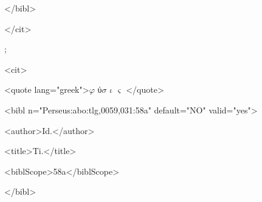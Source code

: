 \documentclass[10pt]{article}
\begin{document}
\begin{adjustwidth}{0.99in}{0.0in}
 </bibl>\par

\end{adjustwidth}

\begin{adjustwidth}{0.85in}{0.0in}
 </cit>\par

\end{adjustwidth}

\begin{adjustwidth}{0.85in}{0.0in}
 ;\par

\end{adjustwidth}

\begin{adjustwidth}{0.85in}{0.0in}
 <cit>\par

\end{adjustwidth}

\begin{adjustwidth}{0.99in}{0.0in}
 <quote lang="greek">$ \varphi $ ύ$ \sigma $ $ \iota $ $ \varsigma $ </quote>\par

\end{adjustwidth}

\begin{adjustwidth}{0.99in}{0.0in}
 <bibl n="Perseus:abo:tlg,0059,031:58a" default="NO" valid="yes">\par

\end{adjustwidth}

\begin{adjustwidth}{1.12in}{0.0in}
 <author>Id.</author>\par

\end{adjustwidth}

\begin{adjustwidth}{1.12in}{0.0in}
 <title>Ti.</title>\par

\end{adjustwidth}

\begin{adjustwidth}{1.12in}{0.0in}
 <biblScope>58a</biblScope>\par

\end{adjustwidth}

\begin{adjustwidth}{0.99in}{0.0in}
 </bibl>\par

\end{adjustwidth}
\end{document}
